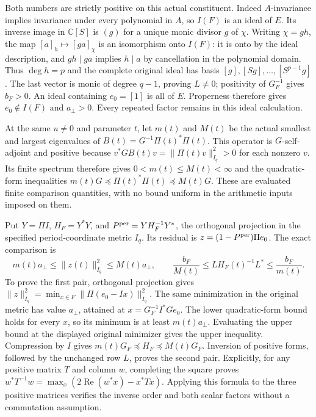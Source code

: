 Both numbers are strictly positive on this actual constituent.
Indeed $A$-invariance implies invariance under every polynomial in
$A$, so $I(F)$ is an ideal of $E$. Its inverse image in
$\mathbb C[S]$ is $(g)$ for a unique monic divisor $g$ of $\chi$.
Writing $\chi=gh$, the map $[a]_h\mapsto[ga]_\chi$ is an
isomorphism onto $I(F)$: it is onto by the ideal description, and
$gh\mid ga$ implies $h\mid a$ by cancellation in the polynomial
domain. Thus $\deg h=p$ and the complete original ideal has basis
$[g],[Sg],\ldots,[S^{p-1}g]$. The last vector is monic of degree
$q-1$, proving $L\ne0$; positivity of $G_F^{-1}$ gives $b_F>0$.
An ideal containing $e_0=[1]$ is all of $E$. Properness therefore
gives $e_0\notin I(F)$ and $a_\perp>0$. Every repeated factor
remains in this ideal calculation.

At the same $u\ne0$ and parameter $t$, let $m(t)$ and $M(t)$ be
the actual smallest and largest eigenvalues of
$B(t)=G^{-1}\Pi(t)^*\Pi(t)$. This operator is $G$-self-adjoint
and positive because $v^*GB(t)v=\|\Pi(t)v\|_{I_q}^2>0$ for
each nonzero $v$. Its finite spectrum therefore gives
$0<m(t)\le M(t)<\infty$ and the quadratic-form inequalities
$m(t)G\preceq\Pi(t)^*\Pi(t)\preceq M(t)G$.
These are evaluated finite comparison quantities, with no bound
uniform in the arithmetic inputs imposed on them.

Put $Y=\Pi I$, $H_F=Y^*Y$, and
$P^{\rm per}=YH_F^{-1}Y^*$, the orthogonal projection in the
specified period-coordinate metric $I_q$. Its residual is
$z=(1-P^{\rm per})\Pi e_0$. The exact comparison is
\[
 \boxed{m(t)a_\perp\le\|z(t)\|_{I_q}^2\le M(t)a_\perp,
 \qquad
 \frac{b_F}{M(t)}\le L H_F(t)^{-1}L^*
                         \le\frac{b_F}{m(t)}.}
 \tag{LC14}
\]
To prove the first pair, orthogonal projection gives
$\|z\|_{I_q}^2=\min_{x\in F}\|\Pi(e_0-Ix)\|_{I_q}^2$.
The same minimization in the original metric has value
$a_\perp$, attained at $x=G_F^{-1}I^*Ge_0$.
The lower quadratic-form bound holds for every $x$, so its minimum
is at least $m(t)a_\perp$. Evaluating the upper bound at the
displayed original minimizer gives the upper inequality.
Compression by $I$ gives $m(t)G_F\preceq H_F\preceq M(t)G_F$.
Inversion of positive forms, followed by the unchanged row $L$,
proves the second pair. Explicitly, for any positive matrix $T$
and column $w$, completing the square proves
$w^*T^{-1}w=\max_x(2\operatorname{Re}(w^*x)-x^*Tx)$.
Applying this formula to the three positive matrices verifies the
inverse order and both scalar factors without a commutation assumption.

